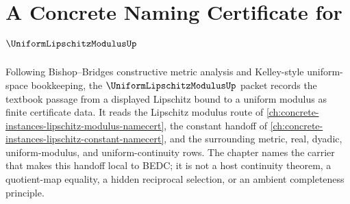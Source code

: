 \chapter{A Concrete Naming Certificate for $\UniformLipschitzModulusUp$}
\label{ch:concrete-instances-uniform-lipschitz-modulus-namecert}

Following Bishop--Bridges constructive metric analysis and Kelley-style uniform-space bookkeeping, the $\UniformLipschitzModulusUp$ packet records the textbook passage from a displayed Lipschitz bound to a uniform modulus as finite certificate data. It reads the Lipschitz modulus route of \autoref{ch:concrete-instances-lipschitz-modulus-namecert}, the constant handoff of \autoref{ch:concrete-instances-lipschitz-constant-namecert}, and the surrounding metric, real, dyadic, uniform-modulus, and uniform-continuity rows. The chapter names the carrier that makes this handoff local to BEDC; it is not a host continuity theorem, a quotient-map equality, a hidden reciprocal selection, or an ambient completeness principle.

